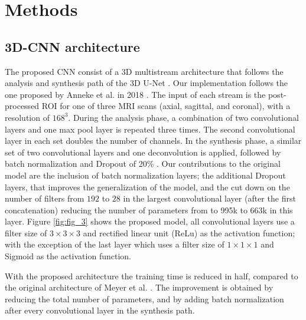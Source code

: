\section{Methods}
\label{sec:methods}




\subsection{3D-CNN architecture}
The proposed CNN consist of a 3D multistream architecture that follows the analysis and synthesis path of the 3D U-Net \cite{cciccek20163d}. Our implementation follows the one proposed by Anneke et al. in 2018  \cite{anneke}. The input of each stream is the post-processed ROI for one of three MRI scans (axial, sagittal, and coronal), with a resolution of $168^3$. During the analysis phase, a combination of two convolutional layers and one max pool layer is repeated three times. The second convolutional layer in each set doubles the number of channels.  In the synthesis phase, a similar set of two convolutional layers and one deconvolution is applied, followed by batch normalization and Dropout of 20\% \cite{hinton2012improving}. Our contributions
to the original model are the inclusion of batch normalization layers; the additional Dropout layers, that improves the generalization of the model, and the cut down on the number of filters from $192$ to $28$ in the largest convolutional layer (after the first concatenation) reducing the number of parameters from to 995k to 663k in this layer. Figure \ref{fig:fig_3} shows the proposed model, all convolutional layers use a filter size of $3 \times 3 \times 3$ and rectified linear unit (ReLu) as the activation function; with the exception of the last layer which uses a filter size of $1 \times 1 \times 1$ and Sigmoid as the activation function. 

With the proposed architecture the training time is reduced in half, compared to the original architecture of Meyer et al. \cite{anneke}. The improvement is obtained by reducing the total number of parameters, and by adding batch normalization after every convolutional layer in the synthesis path.

